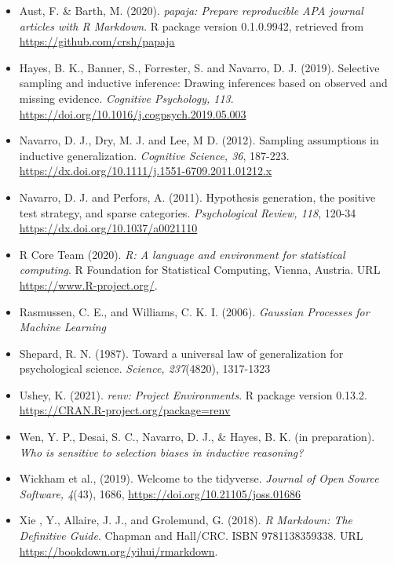 \documentclass[
  english,
  doc]{apa6}
\providecommand{\tightlist}{%
  \setlength{\itemsep}{0pt}\setlength{\parskip}{0pt}}
\begin{document}
\begin{itemize}
\tightlist
\item
  Aust, F. \& Barth, M. (2020). \emph{papaja: Prepare reproducible APA journal
  articles with R Markdown}. R package version 0.1.0.9942, retrieved from
  \url{https://github.com/crsh/papaja}
\item
  Hayes, B. K., Banner, S., Forrester, S. and Navarro, D. J. (2019). Selective sampling and inductive inference: Drawing inferences based on observed and missing evidence. \emph{Cognitive Psychology, 113}. \url{https://doi.org/10.1016/j.cogpsych.2019.05.003}
\item
  Navarro, D. J., Dry, M. J. and Lee, M D. (2012). Sampling assumptions in inductive generalization. \emph{Cognitive Science, 36}, 187-223. \url{https://dx.doi.org/10.1111/j.1551-6709.2011.01212.x}
\item
  Navarro, D. J. and Perfors, A. (2011). Hypothesis generation, the positive test strategy, and sparse categories. \emph{Psychological Review, 118}, 120-34 \url{https://dx.doi.org/10.1037/a0021110}
\item
  R Core Team (2020). \emph{R: A language and environment for statistical computing}. R Foundation for Statistical Computing, Vienna, Austria. URL
  \url{https://www.R-project.org/}.
\item
  Rasmussen, C. E., and Williams, C. K. I. (2006). \emph{Gaussian Processes for Machine Learning}
\item
  Shepard, R. N. (1987). Toward a universal law of generalization for psychological science. \emph{Science, 237}(4820), 1317-1323
\item
  Ushey, K. (2021). \emph{renv: Project Environments}. R package version 0.13.2.
  \url{https://CRAN.R-project.org/package=renv}
\item
  Wen, Y. P., Desai, S. C., Navarro, D. J., \& Hayes, B. K. (in preparation). \emph{Who is sensitive to selection biases in inductive reasoning?}
\item
  Wickham et al., (2019). Welcome to the tidyverse. \emph{Journal of Open Source Software, 4}(43), 1686, \url{https://doi.org/10.21105/joss.01686}
\item
  Xie , Y., Allaire, J. J., and Grolemund, G. (2018). \emph{R Markdown: The Definitive Guide}. Chapman and Hall/CRC. ISBN 9781138359338. URL \url{https://bookdown.org/yihui/rmarkdown}.
\end{itemize}
\end{document}
